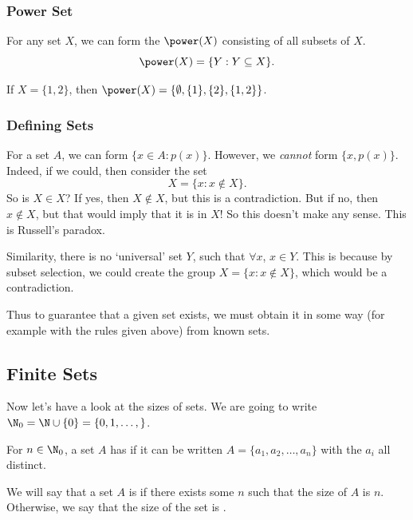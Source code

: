 \subsubsection{Power Set}
\vspace{\baselineskip}
\begin{definition}
	For any set $X$, we can form the  $\power(X)$ consisting of all subsets of $X$.
	$$
	\power(X) = \{Y : Y \subseteq X\}.
	$$
\end{definition}

\begin{example}
	If $X = \{1, 2\}$, then $\power(X) = \{\emptyset, \{1\}, \{2\}, \{1, 2\}\}$.
\end{example}


\subsubsection{Defining Sets}

For a set $A$, we can form $\{x \in A : p(x) \}$.
However, we \emph{cannot} form $\{x, p(x)\}$.
Indeed, if we could, then consider the set
$$
X = \{x : x \not\in X\}.
$$
So is $X \in X$? If yes, then $X \not\in X$, but this is a contradiction. But if no, then $x \not \in X$, but that would imply that it is in $X$! So this doesn't make any sense. This is Russell's paradox.

Similarity, there is no `universal' set $Y$, such that $\forall x$, $x \in Y$. This is because by subset selection, we could create the group $X = \{x : x \not\in X\}$, which would be a contradiction.

Thus to guarantee that a given set exists, we must obtain it in some way (for example with the rules given above) from known sets.

\subsection{Finite Sets}

Now let's have a look at the sizes of sets. We are going to write $\N_0 = \N \cup \{0\} = \{0, 1, \dots, \}$.

\begin{definition}[Size]
	For $n \in \N_0$, a set $A$ has  if it can be written $A = \{a_1, a_2, \dots, a_n\}$ with the $a_i$ all distinct.
\end{definition}

\begin{definition}[Finite]
	We will say that a set $A$ is  if there exists some $n$ such that the size of $A$ is $n$. Otherwise, we say that the size of the set is .
\end{definition}


